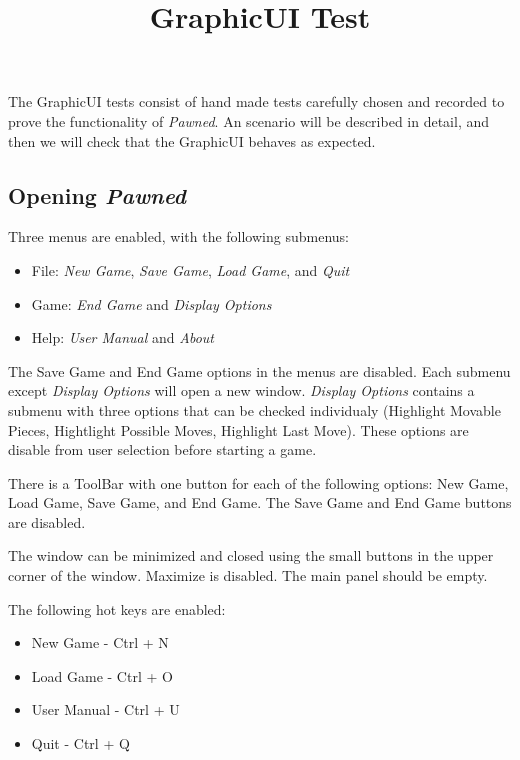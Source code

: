 \documentclass{report}
\title{GraphicUI Test}
\begin{document}
		
		The GraphicUI tests consist of hand made tests carefully chosen and recorded
		to prove the functionality of \emph{Pawned}. An scenario will be described in 
		detail, and then we will check that the GraphicUI behaves as expected.
				
		\subsection{Opening \textit{Pawned}} 
		
		Three menus are enabled, with the following submenus: 
		\begin{itemize}
			\item File: \textit{New Game}, \textit{Save Game}, \textit{Load Game}, and 
									\textit{Quit}
			\item Game: \textit{End Game} and \textit{Display Options}  
			\item Help: \textit{User Manual} and \textit{About}
		\end{itemize}
		
		The Save Game and End Game options in the menus are disabled.
		Each submenu except \textit{Display Options} will open a new window. 
		\textit{Display Options} contains a submenu with three options that can be 
		checked individualy (Highlight Movable Pieces, Hightlight Possible Moves, 
		Highlight Last Move). These options are disable from user selection before 
		starting a game.
		
		There is a ToolBar with one button for each of the following options:
		New Game, Load Game, Save Game, and End Game. The Save Game and End Game
		buttons are disabled.
		
		The window can be minimized and closed using the small buttons in the
		upper corner of the window. Maximize is disabled. The main panel 
		should be empty.
		
		The following hot keys are enabled:
				\begin{itemize}
					\item New Game - Ctrl + N
					\item Load Game - Ctrl + O
					\item User Manual - Ctrl + U
					\item Quit - Ctrl + Q
				\end{itemize}		
		 
		 
\end{document}
